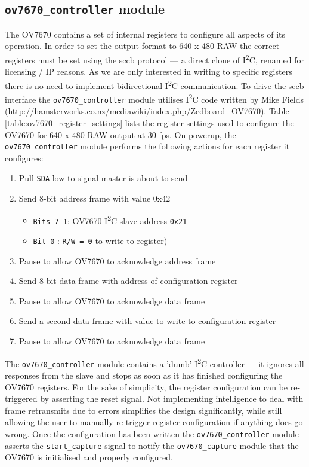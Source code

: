 \subsection{\texttt{ov7670\_controller} module}
The OV7670 contains a set of internal registers to configure all aspects of its operation. In order to set the output format to 640 x 480 RAW the correct registers must be set using the \gls{sccb} protocol --- a direct clone of I\textsuperscript{2}C, renamed for licensing / IP reasons. As we are only interested in writing to specific registers there is no need to implement bidirectional I\textsuperscript{2}C communication. To drive the \gls{sccb} interface the \texttt{ov7670\_controller} module utilises I\textsuperscript{2}C code written by Mike Fields (http://hamsterworks.co.nz/mediawiki/index.php/Zedboard_OV7670). Table \ref{table:ov7670_register_settings} lists the register settings used to configure the OV7670 for 640 x 480 RAW output at 30 \gls{fps}. On powerup, the \texttt{ov7670\_controller} module performs the following actions for each register it configures:

\begin{enumerate}
    \item Pull \texttt{SDA} low to signal master is about to send
    \item Send 8-bit address frame with value 0x42
        \begin{itemize}
            \item \texttt{Bits 7--1}: OV7670 I\textsuperscript{2}C slave address \texttt{0x21}
            \item \texttt{Bit 0}    : \texttt{R/W = 0} to write to register) 
        \end{itemize}
    \item Pause to allow OV7670 to acknowledge address frame
    \item Send 8-bit data frame with address of configuration register
    \item Pause to allow OV7670 to acknowledge data frame
    \item Send a second data frame with value to write to configuration register
    \item Pause to allow OV7670 to acknowledge data frame
\end{enumerate}

The \texttt{ov7670\_controller} module contains a 'dumb' I\textsuperscript{2}C controller --- it ignores all responses from the slave and stops as soon as it has finished configuring the OV7670 registers. For the sake of simplicity, the register configuration can be re-triggered by asserting the reset signal. Not implementing intelligence to deal with frame retransmits due to errors simplifies the design significantly, while still allowing the user to manually re-trigger register configuration if anything does go wrong. Once the configuration has been written the \texttt{ov7670\_controller} module asserts the \texttt{start\_capture} signal to notify the \texttt{ov7670\_capture} module that the OV7670 is initialised and properly configured.

